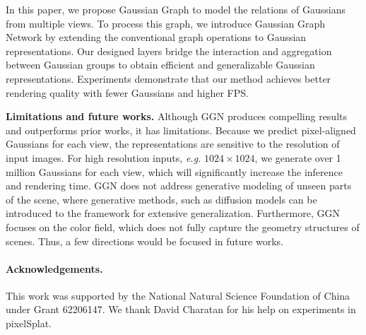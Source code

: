 In this paper, we propose Gaussian Graph to model the relations of Gaussians from multiple views. To process this graph, we introduce Gaussian Graph Network by extending the conventional graph operations to Gaussian representations. Our designed layers  bridge the interaction and aggregation between Gaussian groups to obtain efficient and generalizable  Gaussian representations. Experiments demonstrate that our method achieves better rendering quality with fewer Gaussians and higher FPS. 

\textbf{Limitations and future works.} Although GGN produces compelling results and outperforms prior works, it has limitations. Because we predict pixel-aligned Gaussians for each view, the representations are sensitive to the resolution of input images. For high resolution inputs, \textit{e.g.} $1024\times 1024$, we generate over 1 million Gaussians for each view, which will significantly increase the inference and rendering time. GGN does not address generative modeling of unseen parts of the scene, where generative methods, such as diffusion models can be introduced to the framework for extensive generalization. Furthermore, GGN focuses on the color field, which does not fully capture the geometry structures of scenes. Thus, a few directions would be focused in future works. 

\paragraph{Acknowledgements.} This work was supported by the National Natural Science Foundation of China under Grant 62206147. We thank David Charatan for his help on experiments in pixelSplat.
